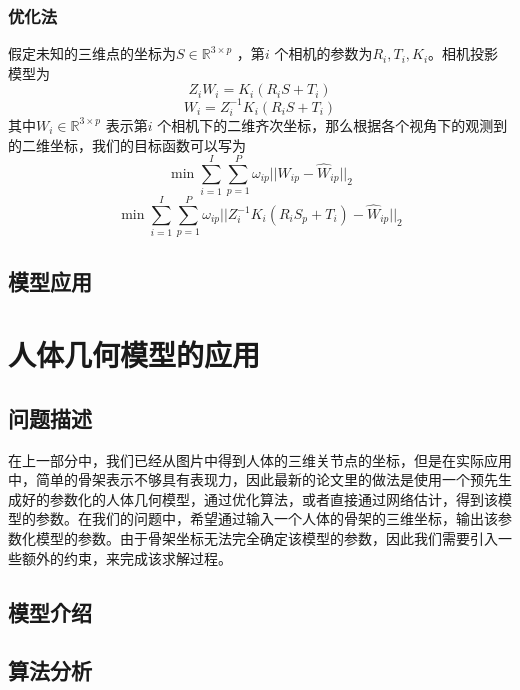 \subsubsection{优化法}
假定未知的三维点的坐标为$S\in \mathbb{R}^{3\times p}$ ，第$i$ 个相机的参数为$R_i,T_i,K_i$。相机投影模型为
\begin{equation}
    Z_i W_i = K_i(R_iS + T_i)
\end{equation}
\begin{equation}
W_i = Z_i^{-1}K_i(R_iS + T_i)    
\end{equation}
其中$W_i\in \mathbb{R}^{3\times p}$  表示第$i$ 个相机下的二维齐次坐标，那么根据各个视角下的观测到的二维坐标，我们的目标函数可以写为
\begin{equation}
    \min \sum^I_{i=1} \sum_{p=1}^P \omega_{ip}||W_{ip} - \hat W_{ip}||_2
\end{equation}
\begin{equation}
    \min \sum^I_{i=1} \sum_{p=1}^P \omega_{ip}||Z_i^{-1}K_i(R_iS_p + T_i) - \hat W_{ip}||_2  
\end{equation}

\subsection{模型应用}

\section{人体几何模型的应用}
\subsection{问题描述}
在上一部分中，我们已经从图片中得到人体的三维关节点的坐标，但是在实际应用中，简单的骨架表示不够具有表现力，因此最新的论文里的做法是使用一个预先生成好的参数化的人体几何模型，通过优化算法，或者直接通过网络估计，得到该模型的参数。在我们的问题中，希望通过输入一个人体的骨架的三维坐标，输出该参数化模型的参数。由于骨架坐标无法完全确定该模型的参数，因此我们需要引入一些额外的约束，来完成该求解过程。

\subsection{模型介绍}

\subsection{算法分析}

